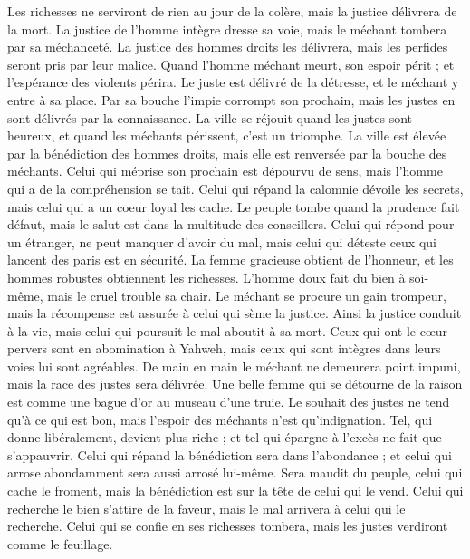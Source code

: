 \begin{multicols}{2}
Les richesses ne serviront de rien au jour de la colère, mais la justice délivrera de la mort.
La justice de l'homme intègre dresse sa voie, mais le méchant tombera par sa méchanceté.
La justice des hommes droits les délivrera, mais les perfides seront pris par leur malice.
Quand l’homme méchant meurt, son espoir périt ; et l'espérance des violents périra.
Le juste est délivré de la détresse, et le méchant y entre à sa place.
Par sa bouche l’impie corrompt son prochain, mais les justes en sont délivrés par la connaissance.
La ville se réjouit quand les justes sont heureux, et quand les méchants périssent, c’est un triomphe.
La ville est élevée par la bénédiction des hommes droits, mais elle est renversée par la bouche des méchants.
Celui qui méprise son prochain est dépourvu de sens, mais l'homme qui a de la compréhension se tait.
Celui qui répand la calomnie dévoile les secrets, mais celui qui a un coeur loyal les cache.
Le peuple tombe quand la prudence fait défaut, mais le salut est dans la multitude des conseillers.
Celui qui répond pour un étranger, ne peut manquer d'avoir du mal, mais celui qui déteste ceux qui lancent des paris est en sécurité.
La femme gracieuse obtient de l'honneur, et les hommes robustes obtiennent les richesses.
L'homme doux fait du bien à soi-même, mais le cruel trouble sa chair.
Le méchant se procure un gain trompeur, mais la récompense est assurée à celui qui sème la justice.
Ainsi la justice conduit à la vie, mais celui qui poursuit le mal aboutit à sa mort.
Ceux qui ont le cœur pervers sont en abomination à Yahweh, mais ceux qui sont intègres dans leurs voies lui sont agréables.
De main en main le méchant ne demeurera point impuni, mais la race des justes sera délivrée.
Une belle femme qui se détourne de la raison est comme une bague d'or au museau d'une truie.
Le souhait des justes ne tend qu’à ce qui est bon, mais l'espoir des méchants n'est qu'indignation.
Tel, qui donne libéralement, devient plus riche ; et tel qui épargne à l’excès ne fait que s’appauvrir.
Celui qui répand la bénédiction sera dans l’abondance ; et celui qui arrose abondamment sera aussi arrosé lui-même.
Sera maudit du peuple, celui qui cache le froment, mais la bénédiction est sur la tête de celui qui le vend.
Celui qui recherche le bien s’attire de la faveur, mais le mal arrivera à celui qui le recherche.
Celui qui se confie en ses richesses tombera, mais les justes verdiront comme le feuillage.

\end{multicols}
